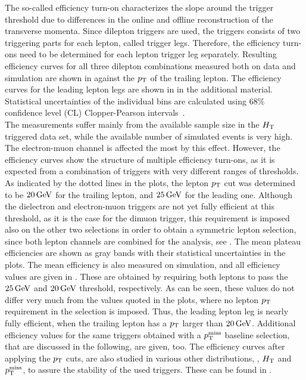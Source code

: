 The so-called efficiency turn-on characterizes the slope around the trigger threshold due to differences in the online and offline reconstruction of the transverse momenta.
Since dilepton triggers are used, the triggers consists of two triggering parts for each lepton, called trigger legs. Therefore, the efficiency turn-ons need to be determined for each lepton trigger leg separately. Resulting efficiency curves for all three dilepton combinations measured both on data and simulation are shown in  against the $p_{\mathrm{T}}$ of the trailing lepton. The efficiency curves for the leading lepton legs are shown in  in the additional material. Statistical uncertainties of the individual bins are calculated using $68\%$ confidence level (CL) Clopper-Pearson intervals~\cite{ClopperPearson}.\\
The measurements suffer mainly from the available sample size in the $H_{\mathrm{T}}$ triggered data set, while the available number of simulated events is very high. The electron-muon channel is affected the most by this effect. However, the efficiency curves show the structure of multiple efficiency turn-ons, as it is expected from a combination of triggers with very different ranges of thresholds. As indicated by the dotted lines in the plots, the lepton $p_{\mathrm{T}}$ cut was determined to be $20\,\text{Ge\hspace{-.08em}V}$ for the trailing lepton, and $25\,\text{Ge\hspace{-.08em}V}$ for the leading one. Although the dielectron and electron-muon triggers are not yet fully efficient at this threshold, as it is the case for the dimuon trigger, this requirement is imposed also on the other two selections in order to obtain a symmetric lepton selection, since both lepton channels are combined for the analysis, see . The mean plateau efficiencies are shown as gray bands with their statistical uncertainties in the plots. The mean efficiency is also measured on simulation, and all efficiency values are given in . These are obtained by requiring both leptons to pass the $25\,\text{Ge\hspace{-.08em}V}$ and $20\,\text{Ge\hspace{-.08em}V}$ threshold, respectively. As can be seen, these values do not differ very much from the values quoted in the plots, where no lepton $p_{\mathrm{T}}$ requirement in the selection is imposed. Thus, the leading lepton leg is nearly fully efficient, when the trailing lepton has a $p_{\mathrm{T}}$ larger than $20\,\text{Ge\hspace{-.08em}V}$. Additional efficiency values for the same triggers obtained with a $p_{\mathrm{T}}^\text{miss}$ baseline selection, that are discussed in the following, are given, too.
The efficiency curves after applying the $p_{\mathrm{T}}$ cuts, are also studied in various other distributions, \eg, $H_{\mathrm{T}}$ and $p_{\mathrm{T}}^\text{miss}$, to assure the stability of the used triggers. These can be found in .
